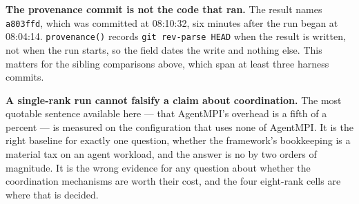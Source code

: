 \documentclass[11pt]{article}
\begin{document}
\textbf{The provenance commit is not the code that ran.} The result names \texttt{a803ffd},
which was committed at 08:10:32, six minutes after the run began at 08:04:14.
\texttt{provenance()} records \texttt{git rev-parse HEAD} when the result is written, not when
the run starts, so the field dates the write and nothing else. This matters for the sibling
comparisons above, which span at least three harness commits.

\textbf{A single-rank run cannot falsify a claim about coordination.} The most quotable
sentence available here --- that AgentMPI's overhead is a fifth of a percent --- is measured on
the configuration that uses none of AgentMPI. It is the right baseline for exactly one
question, whether the framework's bookkeeping is a material tax on an agent workload, and the
answer is no by two orders of magnitude. It is the wrong evidence for any question about
whether the coordination mechanisms are worth their cost, and the four eight-rank cells are
where that is decided.
\end{document}
